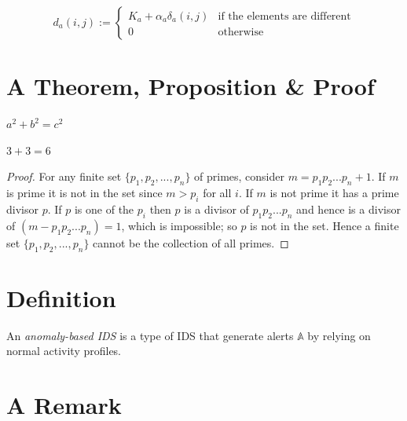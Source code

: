 \begin{equation}
d_a(i,j) := \left\{
\begin{array}{lll}
K_a + \alpha_{a} \delta_{a}(i,j) & \mbox{if the elements are different} \\
0 & \mbox{otherwise}
\end{array}
\right.
\label{eq:distfunction}
\end{equation}


\section{A Theorem, Proposition \& Proof}

\begin{thm}
$a^2 + b^2 = c^2$
\end{thm}

\begin{prop}
$3 + 3 = 6$
\end{prop}

\begin{proof}
For any finite set $\{p_1,p_2,...,p_n\}$ of primes, consider $m = p_1p_2...p_n+1$. If $m$ is prime it is not in the set since $m > p_i$ for all $i$. If $m$ is not prime it has a prime divisor $p$. If $p$ is one of the $p_i$ then $p$ is a divisor of $p_1p_2...p_n$ and hence is a divisor of $(m - p_1p_2...p_n) = 1$, which is impossible; so $p$ is not in the set. Hence a finite set $\{p_1,p_2,...,p_n\}$ cannot be the collection of all primes.
\end{proof}


\section{Definition}

\begin{definition}
An \emph{anomaly-based \ac{IDS}} is a type of \ac{IDS} that generate alerts $\mathbb{A}$ by relying on normal activity profiles.
\end{definition}


\section{A Remark}

